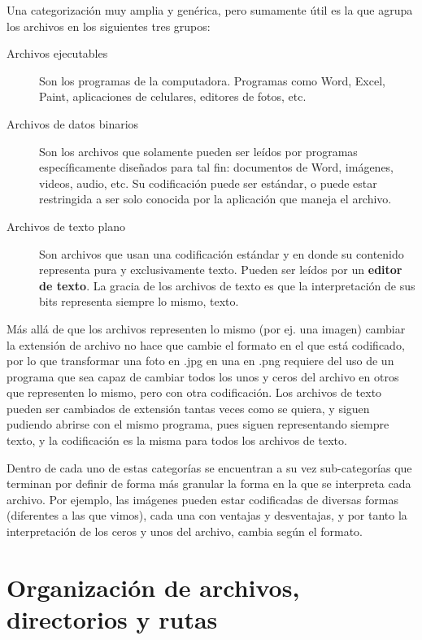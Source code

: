 \vspace{0.5cm}
Una categorización muy amplia y genérica, pero sumamente útil es la que agrupa
los archivos en los siguientes tres grupos:

\begin{description}
    \item[Archivos ejecutables]
        Son los programas de la computadora. Programas como Word, Excel, Paint,
        aplicaciones de celulares, editores de fotos, etc.
    \item[Archivos de datos binarios]    
        Son los archivos que solamente pueden ser leídos por programas
        específicamente diseñados para tal fin: documentos de Word, imágenes,
        videos, audio, etc. Su codificación puede ser estándar, o puede estar
        restringida a ser solo conocida por la aplicación que maneja el archivo.
    \item[Archivos de texto plano] 
        Son archivos que usan una codificación estándar y en donde su contenido
        representa pura y exclusivamente texto. Pueden ser leídos por un
        \textbf{editor de texto}. La gracia de los archivos de texto es que la
        interpretación de sus bits representa siempre lo mismo, texto.
\end{description}

\begin{knowwhat}
Más allá de que los archivos representen lo mismo (por ej. una imagen)
cambiar la extensión de archivo no hace que cambie el formato en el que
está codificado, por lo que transformar una foto en .jpg en una en .png
requiere del uso de un programa que sea capaz de cambiar todos los unos
y ceros del archivo en otros que representen lo mismo, pero con otra
codificación.
Los archivos de texto pueden ser cambiados de extensión tantas veces
como se quiera, y siguen pudiendo abrirse con el mismo programa, pues
siguen representando siempre texto, y la codificación es la misma para
todos los archivos de texto.
\end{knowwhat}

Dentro de cada uno de estas categorías se encuentran a su vez sub-categorías que
terminan por definir de forma más granular la forma en la que se interpreta cada
archivo. Por ejemplo, las imágenes pueden estar codificadas de diversas formas
(diferentes a las que vimos), cada una con ventajas y desventajas, y por tanto
la interpretación de los ceros y unos del archivo, cambia según el formato.

\section{Organización de archivos, directorios y rutas}

